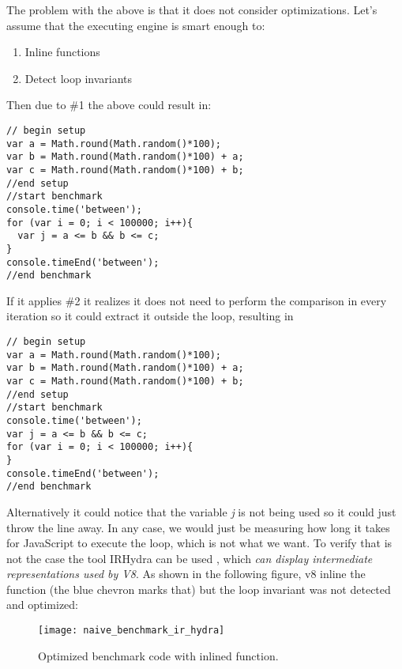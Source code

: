 The problem with the above is that it does not consider optimizations. Let's assume that the executing engine is smart enough to:
\begin{enumerate}
  \item Inline functions
  \item Detect loop invariants
\end{enumerate}

Then due to \#1 the above could result in:
\begin{lstlisting}[caption=Naive benchmark after inlining]
// begin setup
var a = Math.round(Math.random()*100);
var b = Math.round(Math.random()*100) + a;
var c = Math.round(Math.random()*100) + b;
//end setup
//start benchmark
console.time('between');
for (var i = 0; i < 100000; i++){
  var j = a <= b && b <= c;
}
console.timeEnd('between');
//end benchmark
\end{lstlisting}

If it applies \#2 it realizes it does not need to perform the comparison in every iteration so it could extract it outside the loop, resulting in
\begin{lstlisting}[caption=Naive benchmark after evaluating loop invariants]
// begin setup
var a = Math.round(Math.random()*100);
var b = Math.round(Math.random()*100) + a;
var c = Math.round(Math.random()*100) + b;
//end setup
//start benchmark
console.time('between');
var j = a <= b && b <= c;
for (var i = 0; i < 100000; i++){
}
console.timeEnd('between');
//end benchmark
\end{lstlisting}

Alternatively it could notice that the variable \textit{j} is not being used so it could just throw the line away. In any case, we would just be measuring how long it takes for JavaScript to execute the loop, which is not what we want. To verify that is not the case the tool IRHydra can be used \cite{ir-hydra}, which \textit{can display intermediate representations used by V8}. As shown in the following figure, v8 inline the function (the blue chevron marks that) but the loop invariant was not detected and optimized:
\begin{figure}[h!]
  \centering
  \texttt{[image: naive\_benchmark\_ir\_hydra]}
  \caption{Optimized benchmark code with inlined function.}
\end{figure}